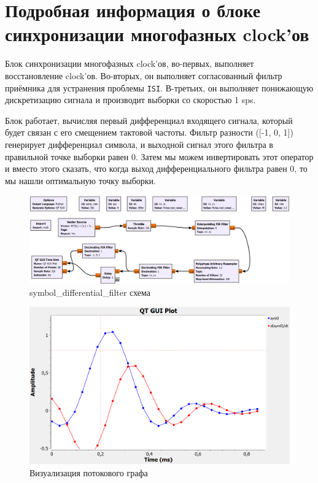 \documentclass[a4paper,12pt]{report}
\begin{document}
\section{Подробная информация о блоке синхронизации многофазных clock'ов}

Блок синхронизации многофазных clock'ов, во-первых, выполняет восстановление clock'ов. Во-вторых, он выполняет согласованный фильтр приёмника для устранения проблемы \texttt{ISI}. В-третьих, он выполняет понижающую дискретизацию сигнала и производит выборки со скоростью 1 sps.

Блок работает, вычисляя первый дифференциал входящего сигнала, который будет связан с его смещением тактовой частоты. Фильтр разности ([-1, 0, 1]) генерирует дифференциал символа, и выходной сигнал этого фильтра в правильной точке выборки равен 0. Затем мы можем инвертировать этот оператор и вместо этого сказать, что когда выход дифференциального фильтра равен 0, то мы нашли оптимальную точку выборки.

\begin{figure}[H]
        \centering
        \includegraphics[width=1.0\textwidth]{lab12_fig3_5.png}
        \caption{symbol\_differential\_filter схема}
        \label{fig:lab12_fig3_5}
\end{figure}

\begin{figure}[H]
        \centering
        \includegraphics[width=1.0\textwidth]{lab12_fig3_6.png}
        \caption{Визуализация потокового графа}
        \label{fig:lab12_fig3_6}
\end{figure}
\end{document}
